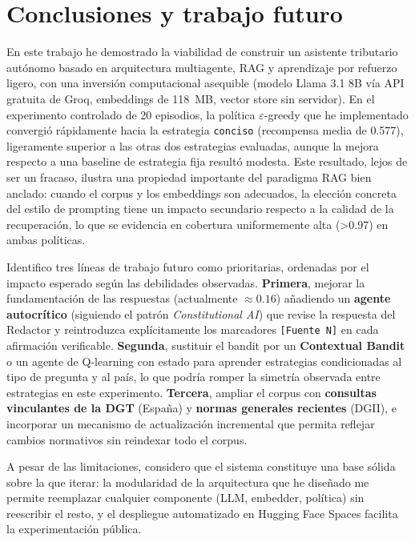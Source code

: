 \documentclass[11pt,a4paper]{article}
\begin{document}
\section{Conclusiones y trabajo futuro}\label{sec:conclusiones}

En este trabajo he demostrado la viabilidad de construir un asistente tributario autónomo basado en arquitectura multiagente, RAG y aprendizaje por refuerzo ligero, con una inversión computacional asequible (modelo Llama 3.1 8B vía API gratuita de Groq, embeddings de 118~MB, vector store sin servidor). En el experimento controlado de 20 episodios, la política $\varepsilon$-greedy que he implementado convergió rápidamente hacia la estrategia \texttt{conciso} (recompensa media de 0.577), ligeramente superior a las otras dos estrategias evaluadas, aunque la mejora respecto a una baseline de estrategia fija resultó modesta. Este resultado, lejos de ser un fracaso, ilustra una propiedad importante del paradigma RAG bien anclado: cuando el corpus y los embeddings son adecuados, la elección concreta del estilo de prompting tiene un impacto secundario respecto a la calidad de la recuperación, lo que se evidencia en cobertura uniformemente alta (\textgreater 0.97) en ambas políticas.

Identifico tres líneas de trabajo futuro como prioritarias, ordenadas por el impacto esperado según las debilidades observadas. \textbf{Primera}, mejorar la fundamentación de las respuestas (actualmente $\approx 0.16$) añadiendo un \textbf{agente autocrítico} (siguiendo el patrón \emph{Constitutional AI}) que revise la respuesta del Redactor y reintroduzca explícitamente los marcadores \texttt{[Fuente~N]} en cada afirmación verificable. \textbf{Segunda}, sustituir el bandit por un \textbf{Contextual Bandit} o un agente de Q-learning con estado para aprender estrategias condicionadas al tipo de pregunta y al país, lo que podría romper la simetría observada entre estrategias en este experimento. \textbf{Tercera}, ampliar el corpus con \textbf{consultas vinculantes de la DGT} (España) y \textbf{normas generales recientes} (DGII), e incorporar un mecanismo de actualización incremental que permita reflejar cambios normativos sin reindexar todo el corpus.

A pesar de las limitaciones, considero que el sistema constituye una base sólida sobre la que iterar: la modularidad de la arquitectura que he diseñado me permite reemplazar cualquier componente (LLM, embedder, política) sin reescribir el resto, y el despliegue automatizado en Hugging Face Spaces facilita la experimentación pública.
\end{document}
